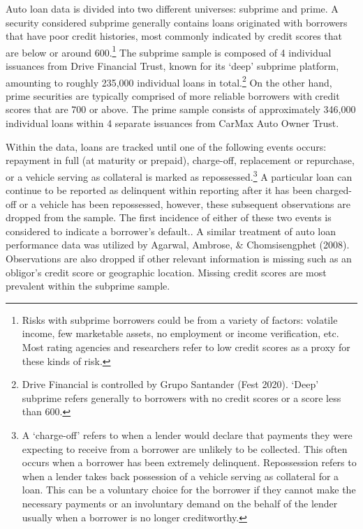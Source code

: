 \documentclass[10.5pt]{article}
\begin{document}
Auto loan data is divided into two different universes: subprime and prime. A security considered subprime generally contains loans originated with borrowers that have poor credit histories, most commonly indicated by credit scores that are below or around 600.\footnote{Risks with subprime borrowers could be from a variety of factors: volatile income, few marketable assets, no employment or income verification, etc. Most rating agencies and researchers refer to low credit scores as a proxy for these kinds of risk.} The subprime sample is composed of 4 individual issuances from Drive Financial Trust, known for its `deep' subprime platform, amounting to roughly 235,000 individual loans in total.\footnote{Drive Financial is controlled by Grupo Santander (Fest 2020). `Deep' subprime refers generally to borrowers with no credit scores or a score less than 600.} On the other hand, prime securities are typically comprised of more reliable borrowers with credit scores that are 700 or above. The prime sample consists of approximately 346,000 individual loans within 4 separate issuances from CarMax Auto Owner Trust.

Within the data, loans are tracked until one of the following events occurs: repayment in full (at maturity or prepaid), charge-off, replacement or repurchase, or a vehicle serving as collateral is marked as repossessed.\footnote{A `charge-off' refers to when a lender would declare that payments they were expecting to receive from a borrower are unlikely to be collected. This often occurs when a borrower has been extremely delinquent. Repossession refers to when a lender takes back possession of a vehicle serving as collateral for a loan. This can be a voluntary choice for the borrower if they cannot make the necessary payments or an involuntary demand on the behalf of the lender usually when a borrower is no longer creditworthy.} A particular loan can continue to be reported as delinquent within reporting after it has been charged-off or a vehicle has been repossessed, however, these subsequent observations are dropped from the sample. The first incidence of either of these two events is considered to indicate a borrower's default.. A similar treatment of auto loan performance data was utilized by Agarwal, Ambrose, \& Chomsisengphet (2008). Observations are also dropped if other relevant information is missing such as an obligor's credit score or geographic location. Missing credit scores are most prevalent within the subprime sample.
\end{document}
